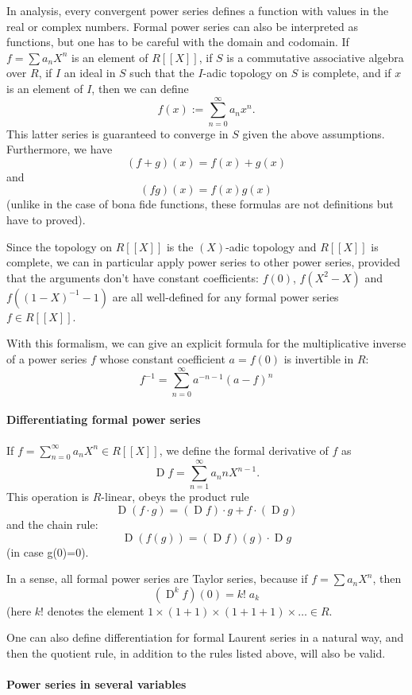 \documentclass[12pt]{article}
\begin{document}
In analysis, every convergent power series defines a function with
values in the real or complex numbers. Formal power series can also be
interpreted as functions, but one has to be careful with the domain
and codomain. If $f=\sum a_n X^n$ is an element of $R[[X]]$, if $S$ is a
commutative associative algebra over $R$, if $I$ an ideal in $S$ such
that the $I$-adic topology on $S$ is complete, and if $x$ is an element
of $I$, then we can define
$$f(x) := \sum_{n=0}^\infty a_n x^n.$$
This latter series is guaranteed to converge in $S$ given the above
assumptions. Furthermore, we have
$$(f+g)(x) = f(x) + g(x)$$
and
$$(fg)(x) = f(x) g(x)$$
(unlike in the case of bona fide functions, these formulas are not
definitions but have to proved).

Since the topology on $R[[X]]$ is the $(X)$-adic topology and $R[[X]]$
is complete, we can in particular apply power series to other power
series, provided that the arguments don't have constant coefficients:
$f(0)$, $f(X^2-X)$ and $f((1-X)^{-1}-1)$ are all well-defined for any
formal power series $f\in R[[X]]$.

With this formalism, we can give an explicit formula for the
multiplicative inverse of a power series $f$ whose constant
coefficient $a=f(0)$ is invertible in $R$:
$$f^{-1} = \sum_{n=0}^\infty a^{-n-1} (a-f)^n$$

\paragraph{Differentiating formal power series}

If $f=\sum_{n=0}^\infty a_n X^n\in R[[X]]$, we define the formal derivative of $f$ as
$$\operatorname{D}f = \sum_{n=1}^{\infty} a_n n X^{n-1}.$$
This operation is $R$-linear, obeys the product rule
$$\operatorname{D}(f\cdot g) = (\operatorname{D}f)\cdot g + f\cdot (\operatorname{D} g)$$
and the chain rule:
$$\operatorname{D}(f(g)) = (\operatorname{D}f)(g)\cdot \operatorname{D}g$$
(in case g(0)=0).

In a sense, all formal power series are Taylor series, because if
$f=\sum a_n X^n$, then 
$$(\operatorname{D}^kf)(0) = k!\; a_k$$
(here $k!$ denotes the element $1\times (1+1)\times(1+1+1)\times\ldots\in R$.

One can also define differentiation for formal Laurent series in a
natural way, and then the quotient rule, in addition to the rules
listed above, will also be valid.

\paragraph{Power series in several variables}
\end{document}

